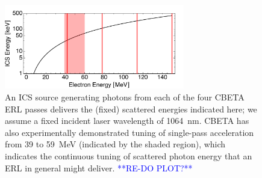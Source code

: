 \documentclass[../main.tex]{subfiles}
\begin{document}
\begin{figure}[!h]
\centering
\includegraphics[width=0.7\textwidth]{Figures/CBETA_Inverse_Compton_Source_Design/CBETA_ICS_energy_tuning.pdf}
\caption{An ICS source generating photons from each of the four CBETA ERL passes delivers the (fixed) scattered energies indicated here; we assume a fixed incident laser wavelength of 1064~\si{\nano\meter}. CBETA has also experimentally demonstrated tuning of single-pass acceleration from 39 to 59~\si{\mega\electronvolt} (indicated by the shaded region), which indicates the continuous tuning of scattered photon energy that an ERL in general might deliver. \textcolor{blue}{**RE-DO PLOT?**}}
\label{fig:CBETA_ICS_energy_tuning}
\end{figure}
\end{document}
